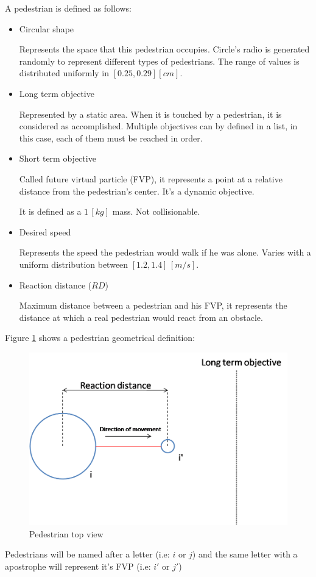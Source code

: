 \documentclass[english]{article}
\numberwithin{equation}{section}
\numberwithin{figure}{section}
\begin{document}
A pedestrian is defined as follows:
\begin{itemize}
\item Circular shape


Represents the space that this pedestrian occupies. Circle's radio
is generated randomly to represent different types of pedestrians.
The range of values is distributed uniformly in $[0.25,0.29]$$[cm]$.

\item Long term objective


Represented by a static area. When it is touched by a pedestrian,
it is considered as accomplished. Multiple objectives can by defined
in a list, in this case, each of them must be reached in order.

\item Short term objective


Called future virtual particle (FVP), it represents a point at a
relative distance from the pedestrian's center. It's a dynamic objective.


It is defined as a $1\,[kg]$ mass. Not collisionable.

\item Desired speed


Represents the speed the pedestrian would walk if he was alone. Varies
with a uniform distribution between $[1.2,1.4]\,[m/s]$.

\item Reaction distance ($RD$)


Maximum distance between a pedestrian and his FVP, it represents the
distance at which a real pedestrian would react from an obstacle.

\end{itemize}
\vspace{1cm}


Figure \ref{fig:Pedestrian-top-view} shows a pedestrian geometrical
definition:

\begin{figure}[H]
\centering{}\includegraphics[scale=0.5]{pics/pedestrian-top}\protect\caption{\label{fig:Pedestrian-top-view}Pedestrian top view}
\end{figure}
\vspace{1cm}
Pedestrians will be named after a letter (i.e: $i$ or $j$) and the same letter with a apostrophe will represent it's FVP (i.e: $i'$ or $j'$)\\
\end{document}
